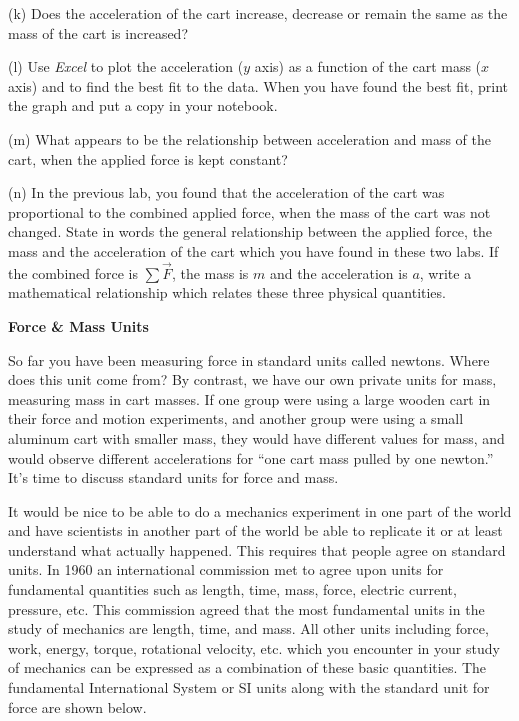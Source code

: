 (k) Does the acceleration of the cart increase, decrease or remain the same
as the mass of the cart is increased?
\answerspace{10mm}

(l) Use \textit{Excel} to plot the acceleration ($y$ axis) as a function of the
cart mass ($x$ axis) and to find the best fit to the data. When you have found
the best fit, print the graph and put a copy in your notebook. 

(m) What appears to be the relationship between acceleration and mass of the
cart, when the applied force is kept constant?
\answerspace{20mm}

(n) In the previous lab, you found that the acceleration of the cart was proportional
to the combined applied force, when the mass of the cart was not changed. State
in words the general relationship between the applied force, the mass and the
acceleration of the cart which you have found in these two labs. If the combined
force is \( \sum{\vec F}  \), the mass is $m$ and the acceleration is $a$,
write a mathematical relationship which relates these three physical quantities.
\answerspace{20mm}

\pagebreak[2]
\textbf{Force \& Mass Units} 

So far you have been measuring force in standard units called newtons. Where
does this unit come from? By contrast, we have our own private units for mass,
measuring mass in cart masses. If one group were using a large wooden cart in
their force and motion experiments, and another group were using a small aluminum
cart with smaller mass, they would have different values for mass, and would
observe different accelerations for ``one cart mass pulled by one newton.''
It's time to discuss standard units for force and mass.

It would be nice to be able to do a mechanics experiment in one part of the
world and have scientists in another part of the world be able to replicate
it or at least understand what actually happened. This requires that people
agree on standard units. In 1960 an international commission met to agree upon
units for fundamental quantities such as length, time, mass, force, electric
current, pressure, etc. This commission agreed that the most fundamental units
in the study of mechanics are length, time, and mass. All other units including
force, work, energy, torque, rotational velocity, etc. which you encounter in
your study of mechanics can be expressed as a combination of these basic quantities.
The fundamental International System or SI units along with the standard unit
for force are shown below.

